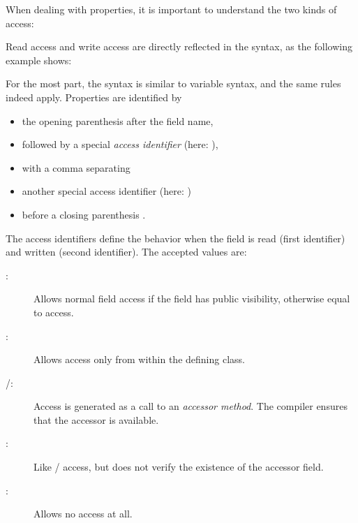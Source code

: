 \documentclass{haxe}
\begin{document}
When dealing with properties, it is important to understand the two kinds of access:



Read access and write access are directly reflected in the syntax, as the following example shows:


For the most part, the syntax is similar to variable syntax, and the same rules indeed apply. Properties are identified by

\begin{itemize}
	\item the opening parenthesis \expr{(} after the field name,
	\item followed by a special \emph{access identifier} (here: ),
	\item with a comma \expr{,} separating
	\item another special access identifier (here: )
	\item before a closing parenthesis \expr{)}.
\end{itemize}

The access identifiers define the behavior when the field is read (first identifier) and written (second identifier). The accepted values are:

\begin{description}
	\item[:] Allows normal field access if the field has public visibility, otherwise equal to  access.
	\item[:] Allows access only from within the defining class.
	\item[/:] Access is generated as a call to an \emph{accessor method}. The compiler ensures that the accessor is available.
	\item[:] Like / access, but does not verify the existence of the accessor field.
	\item[:] Allows no access at all.
\end{description}
\end{document}
